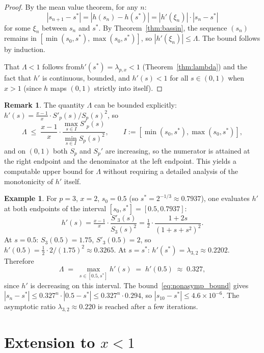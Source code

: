 \documentclass[11pt,a4paper]{article}
\theoremstyle{definition}
\newtheorem{remark}{Remark}[section]
\newtheorem{example}{Example}[section]
\begin{document}
\begin{proof}
By the mean value theorem, for any $n$:
\[
  |s_{n+1} - s^*| = |h(s_n) - h(s^*)| = |h'(\xi_n)| \cdot |s_n - s^*|
\]
for some $\xi_n$ between $s_n$ and $s^*$. By Theorem~\ref{thm:bassin}, the sequence $(s_n)$ remains in $[\min(s_0,s^*), \max(s_0,s^*)]$, so $|h'(\xi_n)| \leq \Lambda$. The bound follows by induction.

That $\Lambda < 1$ follows from$h'(s^*) = \lambda_{p,x} < 1$ (Theorem~\ref{thm:lambda}) and the fact that $h'$ is continuous, bounded, and $h'(s) < 1$ for all $s \in (0,1)$ when $x > 1$ (since $h$ maps $(0,1)$ strictly into itself).
\end{proof}

\begin{remark}
The quantity $\Lambda$ can be bounded explicitly: $h'(s) = \tfrac{x-1}{x} \cdot S'_p(s)/S_p(s)^2$, so
\[
  \Lambda \;\leq\; \frac{x-1}{x} \cdot \frac{\max_{s \in I} S'_p(s)}{\min_{s \in I} S_p(s)^2},
  \qquad I := [\min(s_0, s^*), \max(s_0, s^*)],
\]
and on $(0,1)$ both $S_p$ and $S_p'$ are increasing, so the numerator is attained at the right endpoint and the denominator at the left endpoint. This yields a computable upper bound for $\Lambda$ without requiring a detailed analysis of the monotonicity of $h'$ itself.
\end{remark}

\begin{example}
For $p = 3$, $x = 2$, $s_0 = 0.5$ (so $s^* = 2^{-1/3} \approx 0.7937$), one evaluates $h'$ at both endpoints of the interval $[s_0, s^*] = [0.5, 0.7937]$:
\[
  h'(s) = \tfrac{x-1}{x} \cdot \frac{S'_3(s)}{S_3(s)^2}
        = \tfrac{1}{2} \cdot \frac{1 + 2s}{(1 + s + s^2)^2}.
\]
At $s = 0.5$: $S_3(0.5) = 1.75$, $S'_3(0.5) = 2$, so $h'(0.5) = \tfrac{1}{2} \cdot 2/(1.75)^2 \approx 0.3265$. At $s = s^*$: $h'(s^*) = \lambda_{3,2} \approx 0.2202$. Therefore
\[
  \Lambda \;=\; \max_{s \in [0.5, s^*]} h'(s) \;=\; h'(0.5) \;\approx\; 0.327,
\]
since $h'$ is decreasing on this interval. The bound~\eqref{eq:nonasymp_bound} gives $|s_n - s^*| \leq 0.327^n \cdot |0.5 - s^*| \leq 0.327^n \cdot 0.294$, so $|s_{10} - s^*| \leq 4.6 \times 10^{-6}$. The asymptotic ratio $\lambda_{3,2} \approx 0.220$ is reached after a few iterations.
\end{example}

\section{Extension to \texorpdfstring{$x < 1$}{x < 1}}
\label{sec:extension_x_less_1}
\end{document}
